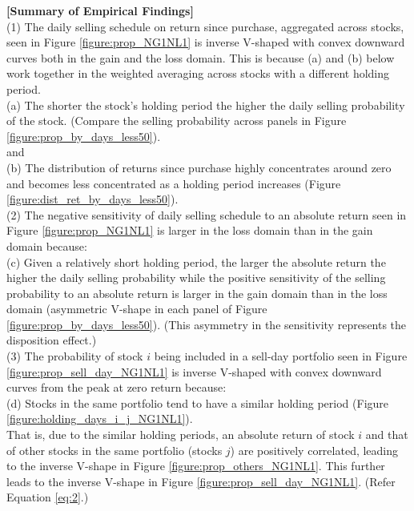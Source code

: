 \documentclass[11pt, a4paper]{article}
\begin{document}
\noindent
\textbf{[Summary of Empirical Findings]}\\
\noindent
(1) The daily selling schedule on return since purchase, aggregated across stocks, seen in Figure \ref{figure:prop_NG1NL1} is inverse V-shaped with convex downward curves both in the gain and the loss domain. This is because (a) and (b) below work together in the weighted averaging across stocks with a different holding period.\\
\noindent
(a) The shorter the stock's holding period the higher the daily selling probability of the stock. (Compare the selling probability across panels in Figure \ref{figure:prop_by_days_less50}).\\
and\\
\noindent
(b) The distribution of returns since purchase highly concentrates around zero and becomes less concentrated as a holding period increases (Figure \ref{figure:dist_ret_by_days_less50}).\\

\noindent
(2) The negative sensitivity of daily selling schedule to an absolute return seen in Figure \ref{figure:prop_NG1NL1} is larger in the loss domain than in the gain domain because:\\
\noindent
(c) Given a relatively short holding period, the larger the absolute return the higher the daily selling probability while the positive sensitivity of the selling probability to an absolute return is larger in the gain domain than in the loss domain (asymmetric V-shape in each panel of Figure \ref{figure:prop_by_days_less50}). (This asymmetry in the sensitivity represents the disposition effect.)\\

\noindent
(3) The probability of stock $i$ being included in a sell-day portfolio seen in Figure \ref{figure:prop_sell_day_NG1NL1} is inverse V-shaped with convex downward curves from the peak at zero return because:\\
\noindent
(d) Stocks in the same portfolio tend to have a similar holding period (Figure \ref{figure:holding_days_i_j_NG1NL1}).\\
That is, due to the similar holding periods, an absolute return of stock $i$ and that of other stocks in the same portfolio (stocks $j$) are positively correlated, leading to the inverse V-shape in Figure \ref{figure:prop_others_NG1NL1}. This further leads to the inverse V-shape in Figure \ref{figure:prop_sell_day_NG1NL1}. (Refer Equation \ref{eq:2}.)\\
\end{document}
